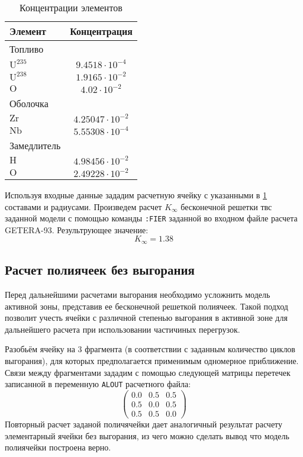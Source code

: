 \begin{table}[H]
	\caption{Концентрации элементов}
	\begin{center}
        \begin{tabular}{|l|c|}
        \toprule
         Элемент & Концентрация\\ 
         \midrule
          Топливо & \\
         \hline
          $\text{U}^{235}$ & $9.4518 \cdot 10^{-4}$\\
         \hline
          $\text{U}^{238}$ & $1.9165\cdot 10^{-2}$\\
         \hline
          $\text{O}$ & $4.02 \cdot 10^{-2}$\\
         \hline
         Оболочка & \\
         \hline
          $\text{Zr}$ & $4.25047 \cdot 10^{-2}$\\
         \hline
          $\text{Nb}$ & $5.55308\cdot 10^{-4}$\\
         \hline
         Замедлитель & \\
         \hline
         $\text{H}$ & $4.98456\cdot 10^{-2}$\\
         \hline
         $\text{O}$ & $2.49228\cdot 10^{-2}$\\
         \bottomrule
		\end{tabular}
		\label{tabular:neutron_conc}
	\end{center}
\end{table}
Используя входные данные зададим расчетную ячейку с указанными в \ref{tabular:neutron_conc} составами и радиусами.
Произведем расчет $K_{\infty}$ бесконечной решетки твс заданной модели с помощью команды \texttt{:FIER} заданной во входном файле расчета GETERA-93. Результрующее значение:
$$
K_{\infty} = 1.38
$$
\subsection{Расчет полиячеек без выгорания}
Перед дальнейшими расчетами выгорания необходимо усложнить модель активной зоны, представив ее бесконечной решеткой  полиячеек. Такой подход позволит учесть ячейки с различной степенью выгорания в активной зоне для дальнейшего расчета при использовании частичиных перегрузок. 

Разобьём ячейку на 3 фрагмента (в соответствии с заданным количество циклов выгорания), для которых предполагается применимым одномерное приближение. Связи между фрагментами зададим с помощью следующей матрицы перетечек записанной в переменную \texttt{ALOUT} расчетного файла:
$$
\begin{pmatrix}
0.0 & 0.5 & 0.5 \\ 
0.5 & 0.0 & 0.5 \\
0.5 & 0.5 & 0.0
\end{pmatrix}
$$
Повторный расчет заданой поличячейки дает аналогичный результат расчету элементарный ячейки без выгорания, из чего можно сделать вывод что модель полиячейки построена верно.

